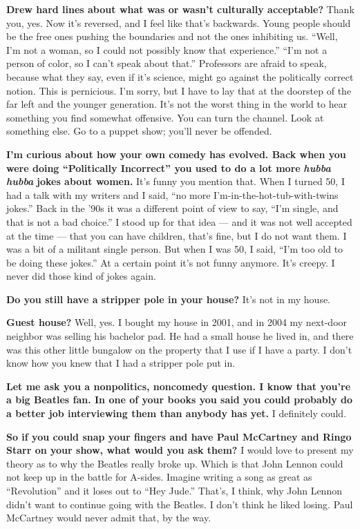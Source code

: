 \textbf{Drew hard lines about what was or wasn't culturally acceptable?}
Thank you, yes. Now it's reversed, and I feel like that's backwards.
Young people should be the free ones pushing the boundaries and not the
ones inhibiting us. ``Well, I'm not a woman, so I could not possibly
know that experience.'' ``I'm not a person of color, so I can't speak
about that.'' Professors are afraid to speak, because what they say,
even if it's science, might go against the politically correct notion.
This is pernicious. I'm sorry, but I have to lay that at the doorstep of
the far left and the younger generation. It's not the worst thing in the
world to hear something you find somewhat offensive. You can turn the
channel. Look at something else. Go to a puppet show; you'll never be
offended.

\textbf{I'm curious about how your own comedy has evolved. Back when you
were doing ``Politically Incorrect'' you used to do a lot more}
\emph{\textbf{hubba hubba}} \textbf{jokes about women.} It's funny you
mention that. When I turned 50, I had a talk with my writers and I said,
``no more I'm-in-the-hot-tub-with-twins jokes.'' Back in the '90s it was
a different point of view to say, ``I'm single, and that is not a bad
choice.'' I stood up for that idea --- and it was not well accepted at
the time --- that you can have children, that's fine, but I do not want
them. I was a bit of a militant single person. But when I was 50, I
said, ``I'm too old to be doing these jokes.'' At a certain point it's
not funny anymore. It's creepy. I never did those kind of jokes again.

\textbf{Do you still have a stripper pole in your house?} It's not in my
house.

\textbf{Guest house?} Well, yes. I bought my house in 2001, and in 2004
my next-door neighbor was selling his bachelor pad. He had a small house
he lived in, and there was this other little bungalow on the property
that I use if I have a party. I don't know how you knew that I had a
stripper pole put in.

\textbf{Let me ask you a nonpolitics, noncomedy question. I know that
you're a big Beatles fan. In one of your books you said you could
probably do a better job interviewing them than anybody has yet.} I
definitely could.

\textbf{So if you could snap your fingers and have Paul McCartney and
Ringo Starr on your show, what would you ask them?} I would love to
present my theory as to why the Beatles really broke up. Which is that
John Lennon could not keep up in the battle for A-sides. Imagine writing
a song as great as ``Revolution'' and it loses out to ``Hey Jude.''
That's, I think, why John Lennon didn't want to continue going with the
Beatles. I don't think he liked losing. Paul McCartney would never admit
that, by the way.

